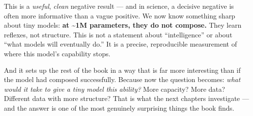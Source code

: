 This is a \emph{useful}, \emph{clean} negative result --- and in
science, a decisive negative is often more informative than a vague
positive. We now know something sharp about tiny models: \textbf{at
\textasciitilde1M parameters, they do not compose.} They learn reflexes,
not structure. This is not a statement about ``intelligence'' or about
``what models will eventually do.'' It is a precise, reproducible
measurement of where this model's capability stops.

And it sets up the rest of the book in a way that is far more
interesting than if the model had composed successfully. Because now the
question becomes: \emph{what would it take to give a tiny model this
ability?} More capacity? More data? Different data with more structure?
That is what the next chapters investigate --- and the answer is one of
the most genuinely surprising things the book finds.
